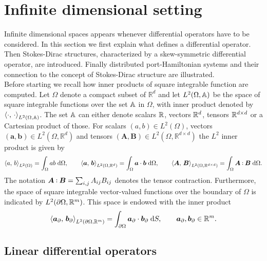 \section{Infinite dimensional setting}

Infinite dimensional spaces appears whenever differential operators have to be considered. In this section we first explain what defines a differential operator. Then Stokes-Dirac structures, characterized by a skew-symmetric differential operator, are introduced. Finally distributed port-Hamiltonian systems and their connection to the concept of Stokes-Dirac structure are illustrated. \\


Before starting we recall how inner products of square integrable function are computed. Let $\Omega$ denote a compact subset of $\mathbb{R}^d$  and let $L^2(\Omega, \bbA)$ be the space of square integrable functions over the set $\bbA$ in $\Omega$, with inner product  denoted by $\inner[L^2(\Omega, \bbA)]{\cdot}{\cdot}$. The set $\bbA$ can either denote scalars $\bbR$, vectors $\bbR^d$,  tensors $\bbR^{d \times d}$ or a Cartesian product of those.  For scalars $(a,b) \in L^2(\Omega)$, vectors $(\bm{a}, \bm{b})\in L^2(\Omega, \mathbb{R}^d)$ and tensors  $(\bm{A}, \bm{B}) \in L^2(\Omega,\mathbb{R}^{d\times d})$ the $L^2$ inner product is given by 
\begin{equation}
\inner[L^2(\Omega)]{a}{b} = \int_{\Omega} a b \d\Omega, \qquad \inner[L^2(\Omega, \mathbb{R}^d)]{\bm{a}}{\bm{b}} = \int_{\Omega} \bm{a} \cdot \bm{b} \d\Omega, \qquad \inner[L^2(\Omega, \mathbb{R}^{d \times d})]{\bm{A}}{\bm{B}} = \int_{\Omega} \bm{A} \cddot \bm{B} \d\Omega.
\end{equation} 
The notation $\bm{A}\cddot \bm{B} = \sum_{i, j} A_{ij} B_{ij}$ denotes the tensor contraction.  Furthermore, the space of square integrable vector-valued functions over the boundary of $\Omega$ is indicated by $L^2(\partial\Omega, \bbR^m)$. This space is endowed with the inner product
\begin{equation}
\inner[L^2(\partial\Omega, \mathbb{R}^m)]{\bm{a}_\partial}{\bm{b}_\partial} = \int_{\partial\Omega} \bm{a}_\partial \cdot \bm{b}_\partial \d{S}, \qquad \bm{a}_\partial, \bm{b}_\partial \in \mathbb{R}^m.
\end{equation}


\subsection{Linear differential operators}

